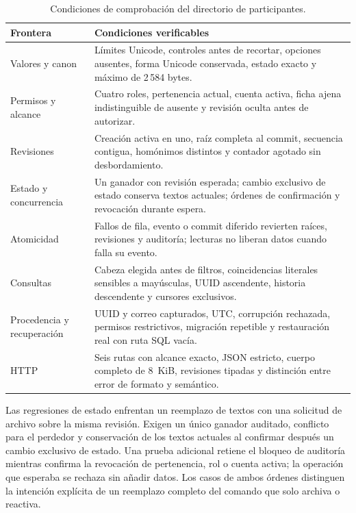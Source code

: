 \begin{table}[H]
  \centering
  \caption{Condiciones de comprobación del directorio de participantes.}
  \label{tab:pruebas-participantes}
  \begin{tabularx}{\linewidth}{@{}L{3.0cm} X@{}}
    \toprule
    \textbf{Frontera} & \textbf{Condiciones verificables} \\
    \midrule
    Valores y canon & Límites Unicode, controles antes de recortar, opciones ausentes, forma Unicode conservada, estado exacto y máximo de 2\,584 bytes. \\
    Permisos y alcance & Cuatro roles, pertenencia actual, cuenta activa, ficha ajena indistinguible de ausente y revisión oculta antes de autorizar. \\
    Revisiones & Creación activa en uno, raíz completa al commit, secuencia contigua, homónimos distintos y contador agotado sin desbordamiento. \\
    Estado y concurrencia & Un ganador con revisión esperada; cambio exclusivo de estado conserva textos actuales; órdenes de confirmación y revocación durante espera. \\
    Atomicidad & Fallos de fila, evento o commit diferido revierten raíces, revisiones y auditoría; lecturas no liberan datos cuando falla su evento. \\
    Consultas & Cabeza elegida antes de filtros, coincidencias literales sensibles a mayúsculas, UUID ascendente, historia descendente y cursores exclusivos. \\
    Procedencia y recuperación & UUID y correo capturados, UTC, corrupción rechazada, permisos restrictivos, migración repetible y restauración real con ruta SQL vacía. \\
    HTTP & Seis rutas con alcance exacto, JSON estricto, cuerpo completo de 8~KiB, revisiones tipadas y distinción entre error de formato y semántico. \\
    \bottomrule
  \end{tabularx}
\end{table}

Las regresiones de estado enfrentan un reemplazo de textos con una solicitud de archivo sobre la misma revisión. Exigen un único ganador auditado, conflicto para el perdedor y conservación de los textos actuales al confirmar después un cambio exclusivo de estado. Una prueba adicional retiene el bloqueo de auditoría mientras confirma la revocación de pertenencia, rol o cuenta activa; la operación que esperaba se rechaza sin añadir datos. Los casos de ambos órdenes distinguen la intención explícita de un reemplazo completo del comando que solo archiva o reactiva.


